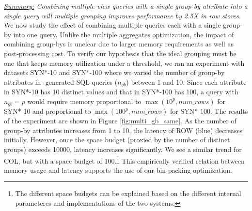 
{\em \underline{Summary:} Combining multiple view queries with a single group-by attribute into a single query will multiple
grouping improves performance by 2.5X in row stores.}
We now study the effect of combining multiple queries each with a single group-by into one query.
Unlike the multiple aggregates optimization, the impact of combining group-bys
is unclear due to larger memory requirements as well as post-processing cost.
To verify our hypothesis that the ideal grouping must be one that keeps memory utilization
under a threshold, we ran an experiment with datasets SYN*-10 and SYN*-100 where
we varied the number of group-by attributes in \SeeDB-generated SQL queries ($n_{gb}$) 
between 1 and 10.
Since each attribute in SYN*-10 has 10 distinct values and that in SYN*-100
has 100, a query with $n_{gb}=p$ would require memory proportional to $\max(10^p,
num\_rows)$ for SYN*-10 and proportional to $\max(100^p, num\_rows)$ for SYN*-100.
The results of the experiment are shown in Figure \ref{fig:multi_gb_same}.
As the number of group-by attributes increases from 1 to 10, the latency of ROW (blue) decreases initially.
However, once the space budget (proxied by the number of distinct groups) exceeds 10000, latency increases significantly.
We see a similar trend for COL, but with a space budget of 100.\footnote{The different space
budgets can be explained based on the different internal parameteres and implementations of
the two systems.}
This empirically verified relation between memory usage and latency supports the use of 
our bin-packing optimization.


